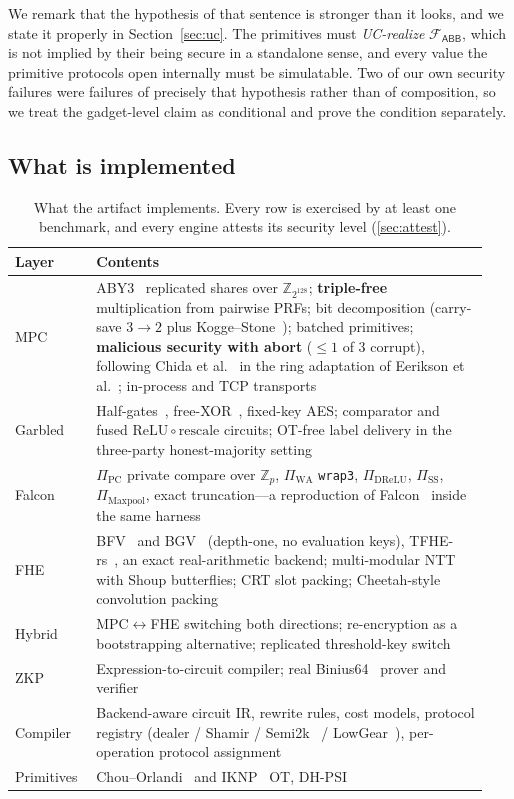 \documentclass[11pt]{article}
\newcommand{\bt}[1]{\texttt{#1}}
\newcommand{\Z}{\mathbb{Z}}
\newcommand{\Fabb}{\mathcal{F}_{\mathsf{ABB}}}
\newcommand{\ReLU}{\ensuremath{\mathrm{ReLU}}}
\begin{document}
We remark that the hypothesis of that sentence is stronger than it looks, and we state it
properly in Section~\ref{sec:uc}. The primitives must \emph{UC-realize} $\Fabb$, which is not
implied by their being secure in a standalone sense, and every value the primitive protocols open
internally must be simulatable. Two of our own security failures were failures of precisely that
hypothesis rather than of composition, so we treat the gadget-level claim as conditional and prove
the condition separately.

\subsection{What is implemented}

\begin{table}[t]
\centering
\small
\begin{tabular}{@{}p{0.16\linewidth}p{0.78\linewidth}@{}}
\toprule
Layer & Contents \\
\midrule
MPC & ABY3~\cite{ABY3} replicated shares over $\Z_{2^{128}}$; \textbf{triple-free} multiplication from pairwise PRFs; bit decomposition (carry-save $3\to2$ plus Kogge--Stone~\cite{KoggeStone}); batched primitives; \textbf{malicious security with abort} ($\le 1$ of 3 corrupt), following Chida et al.~\cite{Chida} in the ring adaptation of Eerikson et al.~\cite{Eerikson}; in-process and TCP transports \\
Garbled & Half-gates~\cite{HalfGates}, free-XOR~\cite{FreeXOR}, fixed-key AES; comparator and fused $\ReLU\circ\text{rescale}$ circuits; OT-free label delivery in the three-party honest-majority setting \\
Falcon & $\Pi_{\mathrm{PC}}$ private compare over $\Z_p$, $\Pi_{\mathrm{WA}}$ \bt{wrap3}, $\Pi_{\mathrm{DReLU}}$, $\Pi_{\mathrm{SS}}$, $\Pi_{\mathrm{Maxpool}}$, exact truncation---a reproduction of Falcon~\cite{Falcon} inside the same harness \\
FHE & BFV~\cite{FV} and BGV~\cite{BGV} (depth-one, no evaluation keys), TFHE-rs~\cite{TFHErs,TFHE}, an exact real-arithmetic backend; multi-modular NTT with Shoup butterflies; CRT slot packing; Cheetah-style~\cite{Cheetah} convolution packing \\
Hybrid & MPC$\leftrightarrow$FHE switching both directions; re-encryption as a bootstrapping alternative; replicated threshold-key switch~\cite{AsharovMHE} \\
ZKP & Expression-to-circuit compiler; real Binius64~\cite{Binius} prover and verifier \\
Compiler & Backend-aware circuit IR, rewrite rules, cost models, protocol registry (dealer / Shamir / Semi2k~\cite{MPSPDZ} / LowGear~\cite{Overdrive}), per-operation protocol assignment \\
Primitives & Chou--Orlandi~\cite{ChouOrlandi} and IKNP~\cite{IKNP} OT, DH-PSI \\
\bottomrule
\end{tabular}
\caption{What the artifact implements. Every row is exercised by at least one
benchmark, and every engine attests its security level (\cref{sec:attest}).}
\label{tab:implemented}
\end{table}
\end{document}
